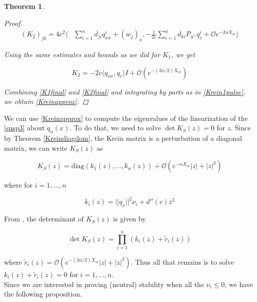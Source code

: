 \documentclass[12pt]{article}
\newtheorem{theorem}{Theorem}
\begin{document}
\begin{theorem}
\begin{proof}
\begin{align}\label{K2expansion2}
(K_2)_{jk} 
= 4 c^2 \langle &\sum_{i = 1}^{n} d_{ji} q^i_{xx} + (w_j)_x, 
-\frac{1}{2c}\sum_{i = 1}^{n} d_{ki} P_{S^\perp} q^i_c + \mathcal{O}e^{-2 \alpha X_m} \rangle
\end{align}

Using the same estimates and bounds as we did for $K_1$, we get

\begin{equation}\label{K2final}
K_2 = -2c \langle q_{xx}, q_c \rangle I + \mathcal{O}(e^{-(3 \alpha/2) X_m})
\end{equation}

Combining \eqref{K1final} and \eqref{K2final} and integrating by parts as in \eqref{Krein1pulse}, we obtain \eqref{Kreinapprox}.

\end{proof}
\end{theorem}

We can use \eqref{Kreinapprox} to compute the eigenvalues of the linearization of the \eqref{susp3} about $q_n(x)$. To do that, we need to solve $\det K_S(z) = 0$ for $z$. Since by Theorem \ref{Kreindiagdom}, the Krein matrix is a perturbation of a diagonal matrix, we can write $K_S(z)$ as 

\begin{equation}
K_S(z) = \text{diag}(k_1(z), \dots, k_n(z)) + \mathcal{O}(e^{-\alpha X_m}|z| + |z|^3)
\end{equation}

where for $i = 1, \dots, n$

\begin{equation}
k_i(z) = ||q_x||^2 \nu_i + d''(c) \overline{z}^2
\end{equation}

From \cite{Ipsen2008}, the determinant of $K_S(z)$ is given by

\begin{equation}\label{detK}
\det K_S(z) = \prod_{i = 1}^n (k_i(z) + \tilde{r}_i(z))
\end{equation}

where $\tilde{r}_i(z) = \mathcal{O}(e^{-(3 \alpha/2) X_m}|z| + |z|^3)$. Thus all that remains is to solve $k_i(z) + \tilde{r}_i(z) = 0$ for $i = 1, \dots, n$.\\

Since we are interested in proving (neutral) stability when all the $\nu_i \leq 0$, we have the following proposition.
\end{document}
